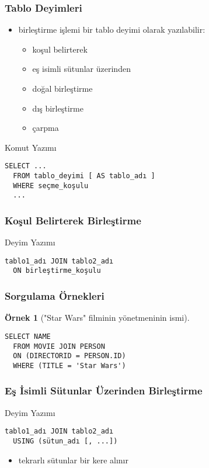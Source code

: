 \documentclass[dvipsnames]{beamer}
\theoremstyle{definition}
\theoremstyle{example}
\newtheorem{ornek}[theorem]{Örnek}
\theoremstyle{plain}
\begin{document}
\begin{frame}[fragile]
  \frametitle{Tablo Deyimleri}

  \begin{itemize}
    \item birleştirme işlemi bir tablo deyimi olarak yazılabilir:
    \begin{itemize}
      \item koşul belirterek
      \item eş isimli sütunlar üzerinden
      \item doğal birleştirme
      \item dış birleştirme
      \item çarpma
    \end{itemize}
  \end{itemize}

  \begin{block}{Komut Yazımı}
    \begin{lstlisting}
SELECT ...
  FROM tablo_deyimi [ AS tablo_adı ]
  WHERE seçme_koşulu
  ...
    \end{lstlisting}
  \end{block}
\end{frame}

\begin{frame}[fragile]
  \frametitle{Koşul Belirterek Birleştirme}

  \begin{block}{Deyim Yazımı}
    \begin{lstlisting}
tablo1_adı JOIN tablo2_adı
  ON birleştirme_koşulu
    \end{lstlisting}
  \end{block}
\end{frame}

\begin{frame}[fragile]
  \frametitle{Sorgulama Örnekleri}

  \begin{ornek}["Star Wars" filminin yönetmeninin ismi]
    \begin{lstlisting}
SELECT NAME
  FROM MOVIE JOIN PERSON
  ON (DIRECTORID = PERSON.ID)
  WHERE (TITLE = 'Star Wars')
    \end{lstlisting}
  \end{ornek}
\end{frame}

\begin{frame}[fragile]
  \frametitle{Eş İsimli Sütunlar Üzerinden Birleştirme}

  \begin{block}{Deyim Yazımı}
    \begin{lstlisting}
tablo1_adı JOIN tablo2_adı
  USING (sütun_adı [, ...])
    \end{lstlisting}
  \end{block}

  \begin{itemize}
    \item tekrarlı sütunlar bir kere alınır
  \end{itemize}
\end{frame}
\end{document}
